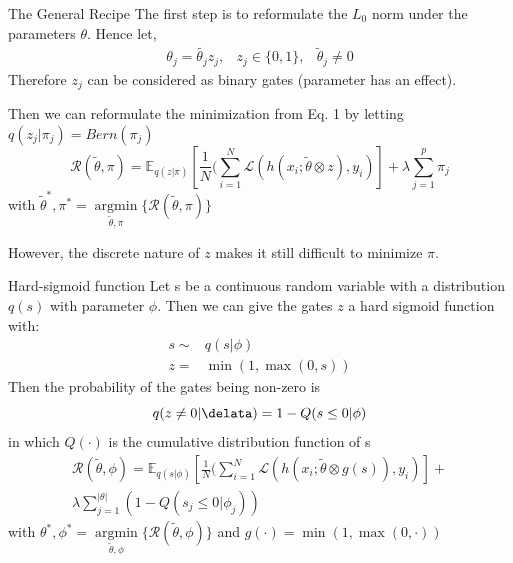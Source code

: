 \documentclass{beamer}
\DeclareMathOperator*{\argmin}{argmin}
\begin{document}
\begin{frame}[t]{The General Recipe}
  The first step is to reformulate the $L_0$ norm under the parameters $\theta$.
  Hence let,
  \begin{equation}
    \begin{matrix}
      \theta_j = \tilde{\theta_j}z_j, & z_j \in \{0, 1\}, & \tilde{\theta}_j \neq 0
    \end{matrix}
  \end{equation}
  Therefore $z_j$ can be considered as binary gates (parameter has an effect).

  Then we can reformulate the minimization from Eq. 1 by letting $q(z_j|\pi_j) = Bern(\pi_j)$
  \begin{equation}
    \mathcal{R}(\tilde{\theta}, \pi) = \mathbb{E}_{q(z|\pi)} [\frac{1}{N} ( \sum^N_{i=1} \mathcal{L}(h(x_i; \tilde{\theta} \otimes z), y_i)] + \lambda \sum^{p}_{j=1} \pi_j
  \end{equation}
  with  $\tilde{\theta}^*, \pi^* = \underset{{\tilde{\theta}, \pi}}{\argmin} \{\mathcal{R}(\tilde{\theta}, \pi)\}$

  However, the discrete nature of $z$ makes it still difficult to minimize $\pi$.
\end{frame}

\begin{frame}[t]{Hard-sigmoid function}
  \small
  Let s be a continuous random variable with a distribution $q(s)$ with parameter $\phi$.
  Then we can give the gates $z$ a hard sigmoid function with:
  \begin{equation}
    \begin{align*}
      s \sim& q(s|\phi) \\
      z =& \min(1, \max(0, s))
    \end{align*}
  \end{equation}
  Then the probability of the gates being non-zero is
  \begin{equation}
    q(z \neq 0 | \delata) =  1 - Q(s\leq 0 | \phi)
  \end{equation}
  in which $Q(\cdot)$ is the cumulative distribution function of s
  \begin{equation}
    \begin{split}
      \mathcal{R}(\tilde{\theta}, \phi) = \mathbb{E}_{q(s|\phi)} [\frac{1}{N} ( \sum^N_{i=1} \mathcal{L}(h(x_i; \tilde{\theta} \otimes g(s)), y_i)] + \\ 
      \lambda \sum^{|\theta|}_{j=1} (1 - Q(s_j \leq 0 | \phi_j))
    \end{split}
  \end{equation}
  with $\theta^*, \phi^* = \underset{{\tilde{\theta}, \phi}}{\argmin} \{\mathcal{R}(\tilde{\theta}, \phi)\}$ and $g(\cdot) = \min(1, \max(0, \cdot))$
\end{frame}
\end{document}

